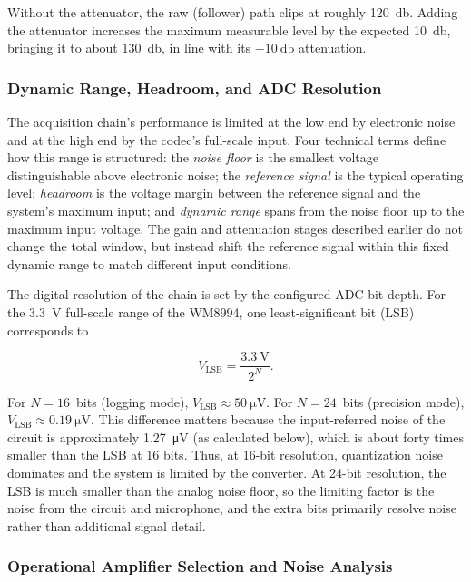 Without the attenuator, the raw (follower) path clips at roughly \SI{120}{\decibel}. Adding the attenuator increases the maximum measurable level by the expected \SI{10}{\decibel}, bringing it to about \SI{130}{\decibel}, in line with its $\SI{-10}{\decibel}$ attenuation.

\subsubsection{Dynamic Range, Headroom, and ADC Resolution}

The acquisition chain’s performance is limited at the low end by electronic noise and at the high end by the codec’s full-scale input. Four technical terms define how this range is structured: the \emph{noise floor} is the smallest voltage distinguishable above electronic noise; the \emph{reference signal} is the typical operating level; \emph{headroom} is the voltage margin between the reference signal and the system’s maximum input; and \emph{dynamic range} spans from the noise floor up to the maximum input voltage. The gain and attenuation stages described earlier do not change the total window, but instead shift the reference signal within this fixed dynamic range to match different input conditions.

The digital resolution of the chain is set by the configured ADC bit depth. For the \SI{3.3}{\volt} full-scale range of the WM8994, one least-significant bit (LSB) corresponds to

\begin{equation}
  V_{\text{LSB}} = \frac{\SI{3.3}{\volt}}{2^{N}}.
  \label{eq:afe_lsb}
\end{equation}

For $N = 16$~bits (logging mode), $V_{\text{LSB}} \approx \SI{50}{\micro\volt}$. For $N = 24$~bits (precision mode), $V_{\text{LSB}} \approx \SI{0.19}{\micro\volt}$. This difference matters because the input-referred noise of the circuit is approximately \SI{1.27}{\micro\volt} (as calculated below), which is about forty times smaller than the LSB at 16 bits. Thus, at 16-bit resolution, quantization noise dominates and the system is limited by the converter. At 24-bit resolution, the LSB is much smaller than the analog noise floor, so the limiting factor is the noise from the circuit and microphone, and the extra bits primarily resolve noise rather than additional signal detail.

\subsubsection{Operational Amplifier Selection and Noise Analysis}
\label{sec:afe_noise}

